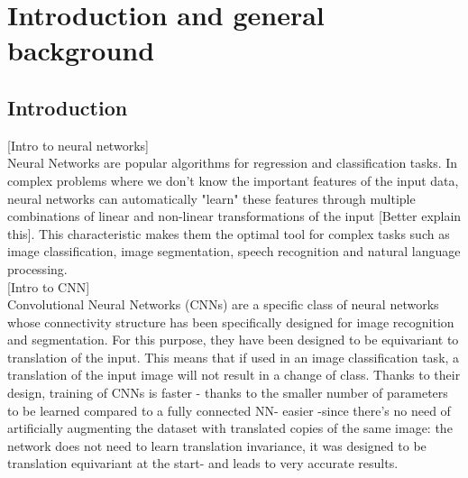 

\setcounter{page}{1}



\section {Introduction and general background} 

\subsection{Introduction}

[Intro to neural networks]\\
Neural Networks are popular algorithms for regression and classification tasks. In complex problems where we don't know the important features of the input data, neural networks can automatically "learn" these features through multiple combinations of linear and non-linear transformations of the input [Better explain this]. This characteristic makes them the optimal tool for complex tasks such as image classification, image segmentation, speech recognition and natural language processing.\\

[Intro to CNN]\\
Convolutional Neural Networks (CNNs) are a specific class of neural networks whose connectivity structure has been specifically designed for image recognition and segmentation. For this purpose, they have been designed to be equivariant to translation of the input. This means that if used in an image classification task, a translation of the input image will not result in a change of class. Thanks to their design, training of CNNs is faster - thanks to the smaller number of parameters to be learned compared to a fully connected NN- easier -since there's no need of artificially augmenting the dataset with translated copies of the same image: the network does not need to learn translation invariance, it was designed to be translation equivariant at the start- and leads to very accurate results.\\

